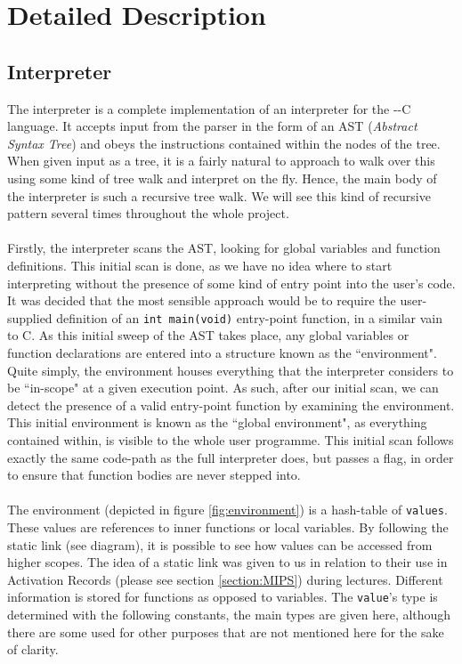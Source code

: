 \chapter{Detailed Description}
\section{Interpreter}
The interpreter is a complete implementation of an interpreter for the -{}-C language. It accepts input from the parser in the form of an AST (\emph{Abstract Syntax Tree}) and obeys the instructions contained within the nodes of the tree. When given input as a tree, it is a fairly natural to approach to walk over this using some kind of tree walk and interpret on the fly. Hence, the main body of the interpreter is such a recursive tree walk. We will see this kind of recursive pattern several times throughout the whole project.
\ \\ \ \\
Firstly, the interpreter scans the AST, looking for global variables and function definitions. This initial scan is done, as we have no idea where to start interpreting without the presence of some kind of entry point into the user's code. It was decided that the most sensible approach would be to require the user-supplied definition of an \verb!int main(void)! entry-point function, in a similar vain to C. As this initial sweep of the AST takes place, any global variables or function declarations are entered into a structure known as the ``environment". Quite simply, the environment houses everything that the interpreter considers to be ``in-scope" at a given execution point. As such, after our initial scan, we can detect the presence of a valid entry-point function by examining the environment. This initial environment is known as the ``global environment", as everything contained within, is visible to the whole user programme. This initial scan follows exactly the same code-path as the full interpreter does, but passes a flag, in order to ensure that function bodies are never stepped into.
\ \\ \ \\
The environment (depicted in figure \ref{fig:environment}) is a hash-table of \verb!values!. These values are references to inner functions or local variables. By following the static link (see diagram), it is possible to see how values can be accessed from higher scopes. The idea of a static link was given to us in relation to their use in Activation Records (please see section \ref{section:MIPS}) during lectures. Different information is stored for functions as opposed to variables. The \verb!value!'s type is determined with the following constants, the main types are given here, although there are some used for other purposes that are not mentioned here for the sake of clarity.

